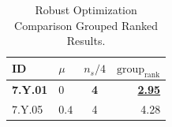 \begin{table}[ht]
\centering
\footnotesize
\caption{Robust Optimization Comparison Grouped Ranked Results.}
\label{tab:robust_comparison_grouped_ranked}
\begin{tabular}{@{}llcr@{}}
\hline
    \textbf{ID} & \textbf{$\mu$} & \textbf{$n_s/4$} & \textbf{$\text{group}_{\text{rank}}$} \\
\hline
    \textbf{7.Y.01} & \textbf{$0$} & \textbf{4} & \textbf{\underline{2.95}} \\
    7.Y.05 & $0.4$ & 4 & 4.28 \\
\hline
\end{tabular}
\end{table}